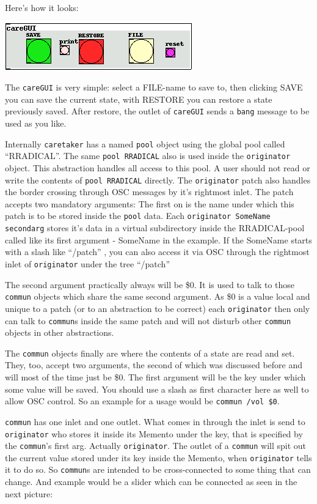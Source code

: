 \documentclass[10pt,english]{scrartcl}
\begin{document}
Here's how it looks:

\includegraphics{caregui.png}

The \texttt{careGUI} is very simple: select a FILE-name to save to, then
clicking SAVE you can save the current state, with RESTORE you can restore
a state previously saved. After restore, the outlet of \texttt{careGUI} sends a
\texttt{bang} message to be used as you like.

Internally \texttt{caretaker} has a named \texttt{pool} object using the global pool
called ``RRADICAL''. The same \texttt{pool RRADICAL} also is used inside the
\texttt{originator} object. This abstraction handles all access to this pool. A
user should not read or write the contents of \texttt{pool RRADICAL} directly.
The \texttt{originator} patch also handles the border crossing through OSC
messages by it's rightmost inlet. The patch accepts two mandatory
arguments: The first on is the name under which this patch is to be stored
inside the \texttt{pool} data. Each \texttt{originator SomeName secondarg}  stores
it's data in a virtual subdirectory inside the RRADICAL-pool called like
its first argument - SomeName in the example. If the SomeName starts with a
slash like ``/patch'' , you can also access it via OSC through the rightmost inlet of
\texttt{originator} under the tree ``/patch''

The second argument practically always will be {\$}0. It is used to talk to
those \texttt{commun} objects which share the same second argument. As {\$}0 is a
value local and unique to a patch (or to an abstraction to be correct) each
\texttt{originator} then only can talk to \texttt{commun}s inside the same patch and
will not disturb other \texttt{commun} objects in other abstractions.

The \texttt{commun} objects finally are where the contents of a state are read
and set. They, too, accept two arguments, the second of which was
discussed before and will most of the time just be {\$}0. The first argument
will be the key under which some value will be saved. You should use a slash
as first character here as well to allow OSC control. So an example for a
usage would be \texttt{commun /vol {\$}0}.

\texttt{commun} has one inlet and one outlet. What comes in through the inlet is
send to \texttt{originator} who stores it inside its Memento under the key, that
is specified by the \texttt{commun}'s first arg. Actually \texttt{originator}. The
outlet of a \texttt{commun} will spit out the current value stored under its key
inside the Memento, when \texttt{originator} tells it to do so. So \texttt{commun}s
are intended to be cross-connected to some thing that can change. And
example would be a slider which can be connected as seen in the next
picture:
\end{document}
